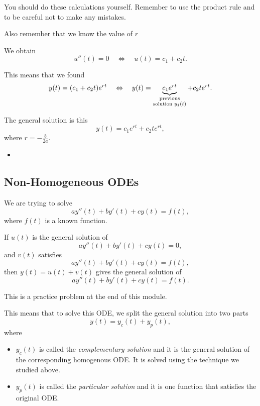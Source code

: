 \begin{graybox}
You should do these calculations yourself.
Remember to use the product rule and to be careful not to make any mistakes.	

Also remember that we know the value of $r$
\end{graybox}

We obtain
$$
u''(t) = 0
\quad \Leftrightarrow \quad u(t) = c_1 + c_2 t.
$$

This means that we found 
$$
y(t) = (c_1 + c_2 t) e^{rt}
\quad \Leftrightarrow \quad y(t) = \underbrace{c_1 e^{rt}}_{\substack{\rm previous \\ \text{solution } y_1(t)}} + c_2 t e^{rt}.
$$

The general solution is this
$$
y(t) = c_1 e^{rt} + c_2 t e^{rt},
$$
where $r = -\frac{b}{2a}$.


\begin{video}
\begin{itemize}
	\item {}
\end{itemize}	
\end{video}






\subsection{Non-Homogeneous ODEs}

We are trying to solve
$$
a y''(t)  + b y'(t) + c y(t) = f(t),
$$
where $f(t)$ is a known function. \\


\begin{graybox}
If $u(t)$ is the general solution of
$$
ay''(t)+by'(t)+cy(t) = 0,
$$
and $v(t)$ satisfies
$$
ay''(t)+by'(t)+cy(t) = f(t),
$$
then $y(t) = u(t) + v(t)$ gives the general solution of
$$
ay''(t)+by'(t)+cy(t) = f(t).
$$

This is a practice problem at the end of this module.
\end{graybox}


This means that to solve this ODE, we split the general solution into two parts
$$
y(t) = y_c(t) + y_p(t),
$$
where
\begin{itemize}
	\item $y_c(t)$ is called the \emph{complementary solution} and it is the general solution of the corresponding homogenous ODE. It is solved using the technique we studied above.
	\item $y_p(t)$ is called the \emph{particular solution} and it is one function that satisfies the original ODE.
\end{itemize}

